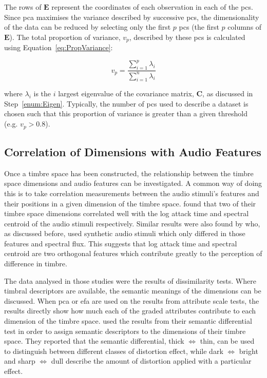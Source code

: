 		The rows of $\mathbf{E}$ represent the coordinates of each observation in each of the \acrshort{pc}s. Since
		\acrshort{pca} maximises the variance described by successive \acrshort{pc}s, the dimensionality of the
		data can be reduced by selecting only the first $p$ \acrshort{pc}s (the first $p$ columns of $\mathbf{E}$).
		The total proportion of variance, $v_{p}$, described by these \acrshort{pc}s is calculated using
		Equation~\ref{eq:PropVariance}:

		\begin{equation}
			v_{p} = \frac{\sum_{i = 1}^{p} \lambda_{i}}{\sum_{i = 1}^{n} \lambda_{i}}
			\label{eq:PropVariance}
		\end{equation}

		where $\lambda_{i}$ is the $i$ largest eigenvalue of the covariance matrix, $\mathbf{C}$, as
		discussed in Step~\ref{enum:Eigen}. Typically, the number of \acrshort{pc}s used to describe a dataset is
		chosen such that this proportion of variance is greater than a given threshold (e.g. $v_{p} > 0.8$).

	\subsection{Correlation of Dimensions with Audio Features}
	\label{sec:Timbre-DimensionalityReduction-DimensionCorrelations}
		Once a timbre space has been constructed, the relationship between the timbre space dimensions and audio
		features can be investigated. A common way of doing this is to take correlation measurements between the
		audio stimuli's features and their positions in a given dimension of the timbre space.
		\citet{mcadams1995perceptual} found that two of their timbre space dimensions correlated well with the log
		attack time and spectral centroid of the audio stimuli respectively. Similar results were also found by
		\citet{caclin2005acoustic} who, as discussed before, used synthetic audio stimuli which only differed in
		those features and spectral flux. This suggests that log attack time and spectral centroid are two
		orthogonal features which contribute greatly to the perception of difference in timbre.
		
		The data analysed in those studies were the results of dissimilarity tests. Where timbral descriptors are
		available, the semantic meanings of the dimensions can be discussed. When \acrshort{pca} or \acrshort{efa}
		are used on the results from attribute scale tests, the results directly show how much each of the graded
		attributes contribute to each dimension of the timbre space. \citet{marui2005timbre} used the results from
		their semantic differential test in order to assign semantic descriptors to the dimensions of their timbre
		space.  They reported that the semantic differential, thick $\Leftrightarrow$ thin, can be used to
		distinguish between different classes of distortion effect, while dark $\Leftrightarrow$ bright and sharp
		$\Leftrightarrow$ dull describe the amount of distortion applied with a particular effect.

